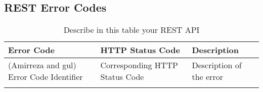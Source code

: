 \subsection{REST Error Codes}


\begin{longtable}{|p{}|p{} |p{}|} 
\hline
\textbf{Error Code} & \textbf{HTTP Status Code} & \textbf{Description} \\\hline
(Amirreza and gul)
Error Code Identifier & Corresponding HTTP Status Code &  Description of the error \\\hline
\caption{Describe in this table your REST API}
\label{tab:termGlossary}
\end{longtable}